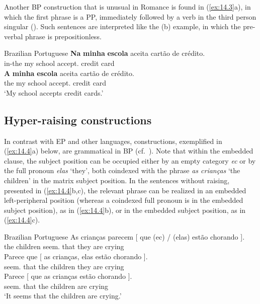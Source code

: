 \documentclass[output=paper]{langsci/langscibook}
\begin{document}
Another \gls{BP} construction that is unusual in
Romance is found in (\ref{ex:14.3}a), in which the first phrase is a PP,
immediately followed by a verb in the third person singular
(\citealt{AvelarCyrino2008}). Such sentences are interpreted like the (b)
example, in which the pre-verbal phrase is prepositionless.

\ea%
    \label{ex:14.3}Brazilian Portuguese
	\ea
    \gll   \textbf{Na} \textbf{minha} \textbf{escola} aceita {cartão de crédito}.\\
            in-the my school accept.\Tsg{} {credit card}\\
    \ex
    \gll \textbf{A} \textbf{minha} \textbf{escola} aceita {cartão de crédito}.\\
            the my school accept.\Tsg{} {credit card}\\
    \glt    ‘My school accepts credit cards.’
    \z
\z

\subsection{Hyper-raising constructions}\label{sec:14.2.3}

In contrast with \gls{EP} and other  languages, 
constructions, exemplified in (\ref{ex:14.4}a) below, are grammatical in
\gls{BP} (cf.\ \citealt{MartinsNunes2010}). Note that within the embedded
clause, the subject position can be occupied either by an empty category
\emph{ec} or by the full pronoun \emph{elas} ‘they’, both coindexed with the
phrase \emph{as crianças} ‘the children’ in the matrix subject position.
In the sentences without raising, presented in (\ref{ex:14.4}b,c), the
relevant phrase can be realized in an embedded left-peripheral position
(whereas a coindexed full pronoun is in the embedded subject position), as in
(\ref{ex:14.4}b), or in the embedded subject position, as in
(\ref{ex:14.4}c).\newpage

\ea%
    \label{ex:14.4}Brazilian Portuguese
	\ea
	\gll    As crianças parecem [ que (ec) / (elas) estão chorando ].\\
            the children seem.\Tpl{} {} that {} {} \hphantom{(}they are crying\\
    \ex
    \gll Parece que [ as crianças, elas estão chorando ].\\
      seem.\Tsg{} that {} the children they are crying\\
    \ex
    \gll    Parece [ que as crianças estão chorando ].\\
            seem.\Tsg{} {} that the children are crying\\
    \glt    ‘It seems that the children are crying.’
    \z
\z
\end{document}
